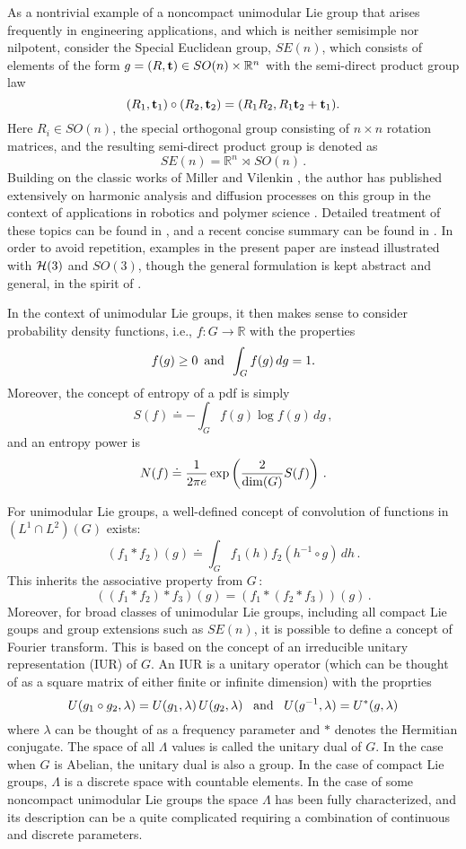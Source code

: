 \documentclass{svmult}
\newcommand{\beq}{ \begin{equation}}
\newcommand{\eeq}{ \end{equation} }
\newcommand{\IR}{\mathbb{R}}
\begin{document}
As a nontrivial example of a noncompact unimodular Lie group that arises frequently in engineering
applications, and which is neither semisimple nor nilpotent, consider the Special Euclidean group, $SE(n)$, which consists of elements of the
form $g = (R, {\bf t}) \in SO(n) \times \IR^n$ with the semi-direct product group law
$$ (R_1, {\bf t}_1) \circ (R_2, {\bf t}_2) = (R_1 R_2, R_1 {\bf t}_2 + {\bf t}_1). $$
Here $R_i \in SO(n)$, the special orthogonal group consisting of $n\times n$
rotation matrices, and the resulting semi-direct product group is denoted as
$$ SE(n) = \IR^n \,\rtimes\, SO(n)\,. $$
Building on the classic works of Miller \cite{8Miller1_l2,Miller64_l2} and Vilenkin
\cite{10Vilenkin1_l2,vilenkin68_l2,8vilenkin_l2},
the author has published extensively on harmonic analysis and diffusion processes on this
group in the context of applications in robotics and polymer science \cite{phasenoise,mypoly,semijoint}.
Detailed treatment of these topics can be found in \cite{dover,vol2}, and a recent concise
summary can be found in \cite{myholm}. In order to avoid repetition, examples in the present
paper are instead illustrated with ${\cal H}(3)$ and $SO(3)$, though the general formulation
is kept abstract and general, in the spirit of
\cite{8folland,8gross,8Gurarie,8hewitt,8sugiura_l2,8taylor_l2,8Grenander,myjgm}.

In the context of unimodular Lie groups, it then makes sense to consider probability density functions, i.e.,
$f:G \rightarrow \IR$ with the properties
$$ f(g) \geq 0 \,\,\, {\rm and} \,\,\, \int_G f(g) \, dg = 1. $$
Moreover, the concept of entropy of a pdf is simply
\beq
S(f) \doteq - \int_G f(g) \log f(g) \, dg\,,
\label{entdef3303}
\eeq
and an entropy power is
$$ N(f) \doteq \frac{1}{2\pi e} \exp\left(\frac{2}{{\rm dim}(G)} S(f)\right)\, . $$

For unimodular Lie groups, a well-defined concept of convolution of functions in $(L^1 \cap L^2)(G)$ exists:
\begin{equation}
(f_1 * f_2)(g) \doteq
\int_{G} f_1(h) f_2(h^{-1} \circ g) \,dh \,.
\label{convdef}
\end{equation}
This inherits the associative property from $G$\,:
$$ ((f_1 * f_2)* f_3)(g) = (f_1 * (f_2 * f_3))(g)\,. $$
Moreover, for broad classes of unimodular Lie groups, including all compact Lie goups and group extensions such as  $SE(n)$, it is possible to define a concept
of Fourier transform. This is based on the concept of an irreducible unitary representation (IUR) of $G$.
An IUR is
a unitary operator (which can be thought of as a square matrix of either finite or infinite dimension) with the
proprties
$$ U(g_1 \circ g_2, \lambda) = U(g_1, \lambda) \, U(g_2, \lambda) \,\,\,\,\, {\rm and} \,\,\,\,\,
U(g^{-1},\lambda) = U^*(g,\lambda) $$
where $\lambda$ can be thought of as a frequency parameter and $*$ denotes the Hermitian conjugate. The space of all $\Lambda$ values is called the unitary dual of $G$. In the case
when $G$ is Abelian, the unitary dual is also a group. In the case of compact Lie groups, $\Lambda$ is a discrete space with countable elements. In the case of some noncompact unimodular Lie groups the space $\Lambda$ has been fully characterized, and its description can be a quite complicated requiring a combination of continuous and discrete parameters.
\end{document}
